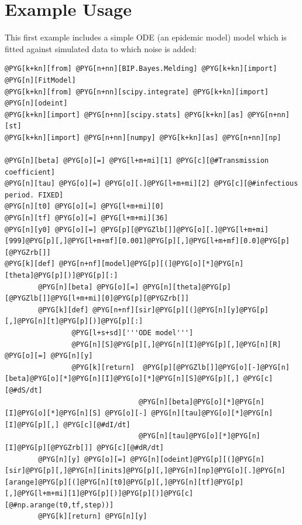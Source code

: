 \documentclass[a4paper,10pt,english]{manual}
\begin{document}
\section{Example Usage}

This first example includes a simple ODE (an epidemic model) model which is fitted against simulated data to which noise is added:

\begin{Verbatim}[commandchars=@\[\]]
@PYG[k+kn][from] @PYG[n+nn][BIP.Bayes.Melding] @PYG[k+kn][import] @PYG[n][FitModel]
@PYG[k+kn][from] @PYG[n+nn][scipy.integrate] @PYG[k+kn][import] @PYG[n][odeint]
@PYG[k+kn][import] @PYG[n+nn][scipy.stats] @PYG[k+kn][as] @PYG[n+nn][st]
@PYG[k+kn][import] @PYG[n+nn][numpy] @PYG[k+kn][as] @PYG[n+nn][np]

@PYG[n][beta] @PYG[o][=] @PYG[l+m+mi][1] @PYG[c][@#Transmission coefficient]
@PYG[n][tau] @PYG[o][=] @PYG[o][.]@PYG[l+m+mi][2] @PYG[c][@#infectious period. FIXED]
@PYG[n][t0] @PYG[o][=] @PYG[l+m+mi][0]
@PYG[n][tf] @PYG[o][=] @PYG[l+m+mi][36]
@PYG[n][y0] @PYG[o][=] @PYG[p][@PYGZlb[]]@PYG[o][.]@PYG[l+m+mi][999]@PYG[p][,]@PYG[l+m+mf][0.001]@PYG[p][,]@PYG[l+m+mf][0.0]@PYG[p][@PYGZrb[]]
@PYG[k][def] @PYG[n+nf][model]@PYG[p][(]@PYG[o][*]@PYG[n][theta]@PYG[p][)]@PYG[p][:]
        @PYG[n][beta] @PYG[o][=] @PYG[n][theta]@PYG[p][@PYGZlb[]]@PYG[l+m+mi][0]@PYG[p][@PYGZrb[]]
        @PYG[k][def] @PYG[n+nf][sir]@PYG[p][(]@PYG[n][y]@PYG[p][,]@PYG[n][t]@PYG[p][)]@PYG[p][:]
                @PYG[l+s+sd]['''ODE model''']
                @PYG[n][S]@PYG[p][,]@PYG[n][I]@PYG[p][,]@PYG[n][R] @PYG[o][=] @PYG[n][y]
                @PYG[k][return]  @PYG[p][@PYGZlb[]]@PYG[o][-]@PYG[n][beta]@PYG[o][*]@PYG[n][I]@PYG[o][*]@PYG[n][S]@PYG[p][,] @PYG[c][@#dS/dt]
                                @PYG[n][beta]@PYG[o][*]@PYG[n][I]@PYG[o][*]@PYG[n][S] @PYG[o][-] @PYG[n][tau]@PYG[o][*]@PYG[n][I]@PYG[p][,] @PYG[c][@#dI/dt]
                                @PYG[n][tau]@PYG[o][*]@PYG[n][I]@PYG[p][@PYGZrb[]] @PYG[c][@#dR/dt]
        @PYG[n][y] @PYG[o][=] @PYG[n][odeint]@PYG[p][(]@PYG[n][sir]@PYG[p][,]@PYG[n][inits]@PYG[p][,]@PYG[n][np]@PYG[o][.]@PYG[n][arange]@PYG[p][(]@PYG[n][t0]@PYG[p][,]@PYG[n][tf]@PYG[p][,]@PYG[l+m+mi][1]@PYG[p][)]@PYG[p][)]@PYG[c][@#np.arange(t0,tf,step))]
        @PYG[k][return] @PYG[n][y]


\end{Verbatim}
\end{document}
